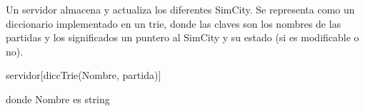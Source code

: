 \begin{Representacion}
  
  
    Un servidor almacena y actualiza los diferentes SimCity. Se representa como un 
    diccionario implementado en un trie, donde las claves son los nombres de las partidas
    y los significados un puntero al SimCity y su estado (si es modificable o no).
  
    \begin{Estructura}{servidor}[diccTrie(Nombre, partida)]
        \begin{Tupla}[partida]
        \end{Tupla}

        \vspace{2mm}
        \begin{Tupla}[pos]
        \end{Tupla}

        \vspace{2mm}
        donde Nombre es string

    \end{Estructura}
    
    \vspace{2mm}
    

\end{Representacion}
